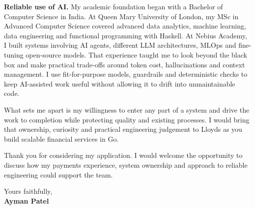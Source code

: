 \documentclass[a4paper,10pt]{article}
\begin{document}
\textbf{Reliable use of AI.} My academic foundation began with a Bachelor of Computer Science in India. At Queen Mary University of London, my MSc in Advanced Computer Science covered advanced data analytics, machine learning, data engineering and functional programming with Haskell. At Nebius Academy, I built systems involving AI agents, different LLM architectures, MLOps and fine-tuning open-source models. That experience taught me to look beyond the black box and make practical trade-offs around token cost, hallucinations and context management. I use fit-for-purpose models, guardrails and deterministic checks to keep AI-assisted work useful without allowing it to drift into unmaintainable code.

What sets me apart is my willingness to enter any part of a system and drive the work to completion while protecting quality and existing processes. I would bring that ownership, curiosity and practical engineering judgement to Lloyds as you build scalable financial services in Go.

Thank you for considering my application. I would welcome the opportunity to discuss how my payments experience, system ownership and approach to reliable engineering could support the team.

Yours faithfully,\\[7pt]
\textbf{Ayman Patel}
\end{document}
